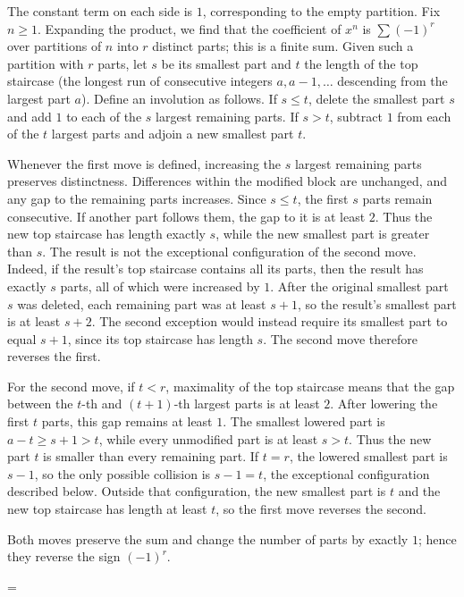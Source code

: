 \documentclass[11pt]{article}
\makeatletter
\let\nt@closedisplay\]
\def\nt@guardedclose{\@ifnextchar\par{\nt@closeafterpar}{\@ifnextchar\end{\postdisplaypenalty\@M\nt@closedisplay}{\nt@closedisplay}}}
\def\nt@closeafterpar\par{\@ifnextchar\par{\nt@closeafterpar}{\@ifnextchar\end{\postdisplaypenalty\@M\nt@closedisplay\par}{\nt@closedisplay\par}}}
\renewenvironment{proof}[1][\proofname]{\par
  \pushQED{\qed}\normalfont\topsep\medskipamount\edef\nt@afterproof{\@endparpenalty=\the\@endparpenalty\relax}\@beginparpenalty\@M\@endparpenalty\@M\let\]\nt@guardedclose\trivlist\item[]\textit{#1\@addpunct{.}} \ignorespaces}{\ifvmode\addpenalty\@M\fi\popQED\nt@afterproof\endtrivlist\@endpefalse}
\theoremstyle{ntstyle}
\makeatother
\begin{document}
\begin{proof} The constant term on each side is $1$, corresponding to
  the empty partition. Fix $n\ge1$. Expanding the product, we find that the coefficient
  of $x^n$ is $\sum(-1)^r$ over partitions of $n$ into $r$ distinct parts;
  this is a finite sum. Given such a partition with $r$ parts, let $s$ be its smallest
  part and $t$ the length of the top staircase (the
  longest run of consecutive integers $a,a-1,\ldots$ descending from the
  largest part $a$). Define an involution as follows. If $s\le t$,
  delete the smallest part $s$ and add $1$ to each of the $s$ largest
  remaining parts. If $s>t$, subtract $1$ from each of the $t$ largest
  parts and adjoin a new smallest part $t$.

  Whenever the first move is defined, increasing the $s$ largest
  remaining parts preserves distinctness. Differences within the
  modified block are unchanged, and any gap to the remaining parts
  increases. Since $s\le t$, the first $s$ parts remain consecutive.
  If another part follows them, the gap to it is at least $2$.
  Thus the new top staircase has length exactly $s$, while the new
  smallest part is greater than $s$. The result is not the exceptional
  configuration of the second move. Indeed, if the result's top staircase
  contains all its parts, then the result has exactly $s$ parts, all of
  which were increased by $1$. After the original smallest part $s$ was
  deleted, each remaining part was at least $s+1$, so the result's smallest
  part is at least $s+2$. The second exception would instead require its
  smallest part to equal $s+1$, since its top staircase has length $s$.
  The second move therefore
  reverses the first.

  For the second move, if $t<r$, maximality of the top staircase
  means that the gap between the $t$-th and $(t+1)$-th largest parts
  is at least $2$. After lowering the first $t$ parts, this gap
  remains at least $1$. The smallest lowered part is $a-t\ge s+1>t$,
  while every unmodified part is at least $s>t$. Thus the new part $t$
  is smaller than every remaining part. If $t=r$, the lowered smallest part is $s-1$,
  so the only possible collision is $s-1=t$, the exceptional
  configuration described below. Outside that configuration, the
  new smallest part is $t$ and the new top staircase has length
  at least $t$, so the first move reverses the second.

  Both moves preserve the sum and change the number of parts by exactly $1$; hence they reverse the sign $(-1)^r$.


\end{proof}
\end{document}
